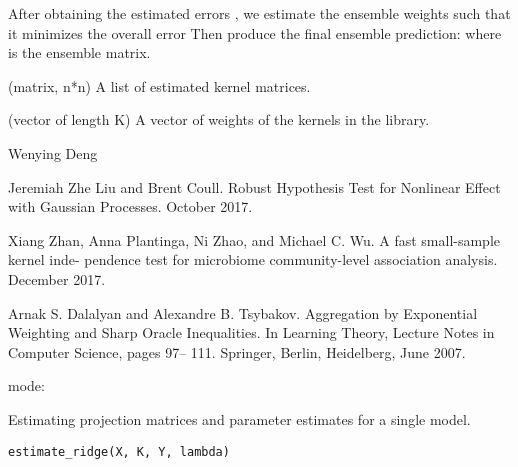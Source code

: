 \documentclass[a4paper]{book}
\begin{document}
%
\begin{Details}\relax
{}

After obtaining the estimated errors , we
estimate the ensemble weights  such that it minimizes
the overall error  Then produce the final ensemble prediction:
 where  is the ensemble matrix.
\end{Details}
%
\begin{Value}
\begin{ldescription}
\item[\code{A\_est}] (matrix, n*n) A list of estimated kernel matrices.

\item[\code{u\_hat}] (vector of length K) A vector of weights of the kernels in the
library.
\end{ldescription}
\end{Value}
%
\begin{Author}\relax
Wenying Deng
\end{Author}
%
\begin{References}\relax
Jeremiah Zhe Liu and Brent Coull. Robust Hypothesis Test for
Nonlinear Effect with Gaussian Processes. October 2017.

Xiang Zhan, Anna Plantinga, Ni Zhao, and Michael C. Wu. A fast small-sample
kernel inde- pendence test for microbiome community-level association
analysis. December 2017.

Arnak S. Dalalyan and Alexandre B. Tsybakov. Aggregation by Exponential
Weighting and Sharp Oracle Inequalities. In Learning Theory, Lecture Notes
in Computer Science, pages 97– 111. Springer, Berlin, Heidelberg, June 2007.
\end{References}
%
\begin{SeeAlso}\relax
mode: 
\end{SeeAlso}
%
\begin{Description}\relax
Estimating projection matrices and parameter estimates for a single model.
\end{Description}
%
\begin{Usage}
\begin{verbatim}
estimate_ridge(X, K, Y, lambda)
\end{verbatim}
\end{Usage}
\end{document}
